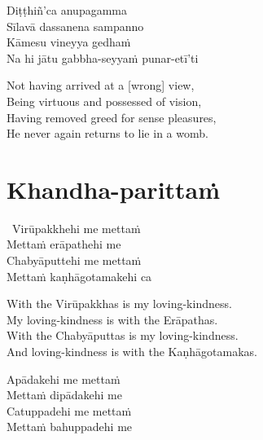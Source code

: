 \begin{pali-hang-continued}
  Diṭṭhiñ'ca anupagamma\\
  Sīlavā dassanena sampanno\\
  Kāmesu vineyya gedhaṁ\\
  Na hi jātu gabbha-seyyaṁ punar-etī'ti
\end{pali-hang-continued}

\begin{english-verses}
  Not having arrived at a [wrong] view,\\
  Being virtuous and possessed of vision,\\
  Having removed greed for sense pleasures,\\
  He never again returns to lie in a womb.
\end{english-verses}

\suttaRef{[Snp 1.8]}



\section{Khandha-parittaṁ}
\label{khandha-parittam}

\begin{pali-hangtogether}
  \anglebracketleft\ \hspace{-0.5mm}Virūpakkhehi me mettaṁ \hspace{-0.5mm}\anglebracketright\ \\
  Mettaṁ erāpathehi me\\
  Chabyāputtehi me mettaṁ\\
  Mettaṁ kaṇhāgotamakehi ca
\end{pali-hangtogether}

\begin{english-verses}
  With the Virūpakkhas is my loving-kindness.\\
  My loving-kindness is with the Erāpathas.\\
  With the Chabyāputtas is my loving-kindness.\\
  And loving-kindness is with the Kaṇhāgotamakas.
\end{english-verses}

\begin{pali-hang-continued}
  Apādakehi me mettaṁ\\
  Mettaṁ dipādakehi me\\
  Catuppadehi me mettaṁ\\
  Mettaṁ bahuppadehi me
\end{pali-hang-continued}

